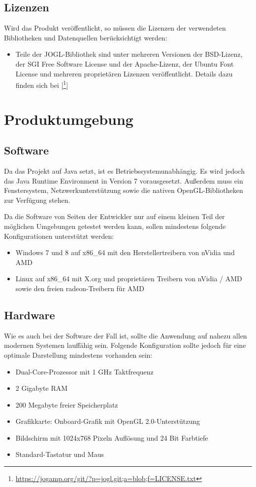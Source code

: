 \documentclass[10pt]{scrreprt}
\begin{document}
\section{Lizenzen}
Wird das Produkt veröffentlicht, so müssen die Lizenzen der verwendeten Bibliotheken und Datenquellen berücksichtigt werden:
\begin{itemize}
\item Teile der JOGL-Bibliothek sind unter mehreren Versionen der BSD-Lizenz, der SGI Free Software License und der Apache-Lizenz, der Ubuntu Font License und mehreren proprietären Lizenzen veröffentlicht. Details dazu finden sich bei [\footnote{\url{https://jogamp.org/git/?p=jogl.git;a=blob;f=LICENSE.txt}}]
\end{itemize}




\chapter{Produktumgebung}
\section{Software}
Da das Projekt auf Java setzt, ist es Betriebssystemunabhängig. Es wird jedoch das Java Runtime Environment in Version 7 vorausgesetzt. Außerdem muss ein Fenstersystem, Netzwerkunterstützung sowie die nativen OpenGL-Bibliotheken zur Verfügung stehen.

Da die Software von Seiten der Entwickler nur auf einem kleinen Teil der möglichen Umgebungen getestet werden kann, sollen mindestens folgende Konfigurationen unterstützt werden:
\begin{itemize}
\item Windows 7 und 8 auf x86{\_}64 mit den Herstellertreibern von nVidia und AMD
\item Linux auf x86{\_}64 mit X.org und proprietären Treibern von nVidia / AMD sowie den freien radeon-Treibern für AMD
\end{itemize}


\section{Hardware}
Wie es auch bei der Software der Fall ist, sollte die Anwendung auf nahezu allen modernen Systemen lauffähig sein. Folgende Konfiguration sollte jedoch für eine optimale Darstellung mindestens vorhanden sein: 
\begin{itemize}
\item Dual-Core-Prozessor mit 1 GHz Taktfrequenz
\item 2 Gigabyte RAM
\item 200 Megabyte freier Speicherplatz
\item Grafikkarte: Onboard-Grafik mit OpenGL 2.0-Unterstützung
\item Bildschirm mit 1024x768 Pixeln Auflösung und 24 Bit Farbtiefe
\item Standard-Tastatur und Maus
\end{itemize}
\end{document}
